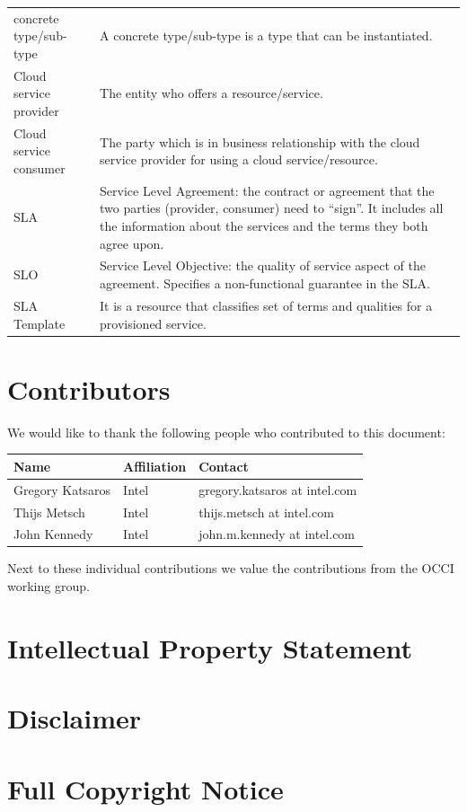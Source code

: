 \documentclass[10pt,a4paper]{article}
\begin{document}
\begin{tabular}{l|p{12cm}}
concrete type/sub-type & A concrete type/sub-type is a type that can be instantiated. \\

Cloud service provider & The entity who offers a resource/service. \\
Cloud service consumer & The party which is in business relationship with the cloud service provider for using a cloud service/resource. \\
SLA & Service Level Agreement: the contract or agreement that the two parties (provider, consumer) need to “sign”. It includes all the information about the services and the terms they both agree upon. \\
SLO & Service Level Objective: the quality of service aspect of the agreement. Specifies a non-functional guarantee in the SLA. \\
SLA Template & It is a resource that classifies set of terms and qualities for a provisioned service. \\
\end{tabular}


\section{Contributors}
%

We would like to thank the following people who contributed to this document:

\begin{tabular}{l|p{2in}|p{2in}}
Name & Affiliation & Contact \\
\hline
Gregory Katsaros & Intel & gregory.katsaros at intel.com \\
Thijs Metsch & Intel & thijs.metsch at intel.com \\
John Kennedy & Intel & john.m.kennedy at intel.com \\
\end{tabular}

Next to these individual contributions we value the contributions from the OCCI working group.

\section{Intellectual Property Statement}


\section{Disclaimer}


\section{Full Copyright Notice}





\appendix
\end{document}
